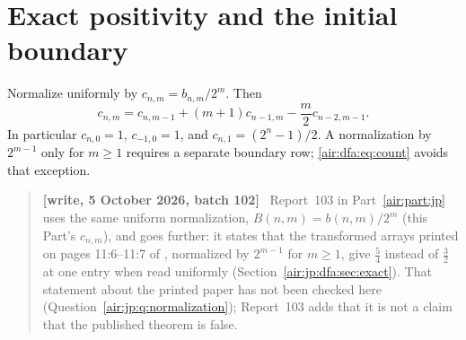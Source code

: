 \documentclass[11pt,letterpaper]{article}
\numberwithin{equation}{section}
\theoremstyle{remark}
\newenvironment{writenotejp}{\par\smallskip\begin{quote}\small\textbf{[write, 5 October 2026, batch 102]}\ }{\end{quote}\smallskip}
\begin{document}
\section{Exact positivity and the initial boundary}\label{air:dfa:sec:positivity}
Normalize uniformly by $c_{n,m}=b_{n,m}/2^m$. Then
\begin{equation}\label{air:dfa:eq:count}
c_{n,m}=c_{n,m-1}+(m+1)c_{n-1,m}-\frac m2 c_{n-2,m-1}.
\end{equation}
In particular $c_{n,0}=1$, $c_{-1,0}=1$, and
$c_{n,1}=(2^n-1)/2$. A normalization by $2^{m-1}$ only for $m\ge1$
requires a separate boundary row; \eqref{air:dfa:eq:count} avoids that exception.
\begin{writenotejp}
Report~103 in Part~\ref{air:part:jp} uses the same uniform normalization, $B(n,m)=b(n,m)/2^m$ (this Part's $c_{n,m}$), and goes further: it states that the transformed arrays printed on pages 11:6--11:7 of \cite{dfa}, normalized by $2^{m-1}$ for $m\ge1$, give $\frac54$ instead of $\frac32$ at one entry when read uniformly (Section~\ref{air:jp:dfa:sec:exact}). That statement about the printed paper has not been checked here (Question~\ref{air:jp:q:normalization}); Report~103 adds that it is not a claim that the published theorem is false.
\end{writenotejp}
\end{document}
